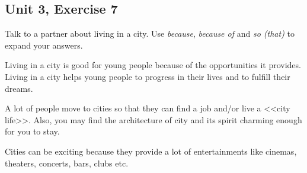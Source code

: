 \subsection*{Unit 3, Exercise 7}
Talk to a partner about living in a city. Use \textit{because}, \textit{because of} and  \textit{so (that)} to expand your answers. 

\begin{answer}
Living in a city is good for young people because of the opportunities it provides. 
Living in a city helps young people to progress in their lives and to fulfill their dreams.
	
A lot of people move to cities so that they can find a job and/or live a <<city life>>.
Also, you may find the architecture of city and its spirit charming enough for you to stay.  
	
Cities can be exciting because they provide a lot of entertainments like cinemas, theaters, concerts, bars, clubs etc.
\end{answer}
